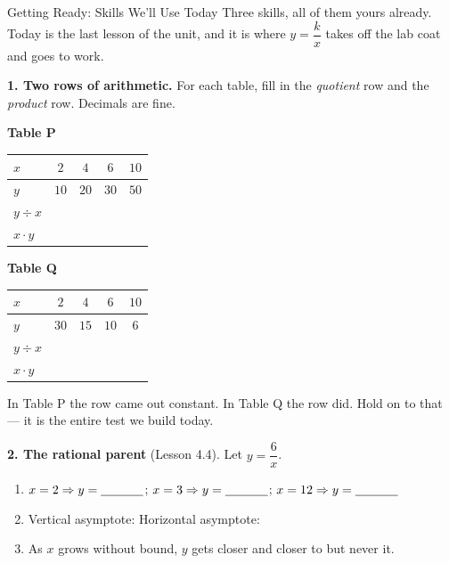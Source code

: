\documentclass[10pt]{article}
\begin{document}
\namedateperiod

\vspace{0.08in}

\begin{notesbox}{Getting Ready: Skills We'll Use Today}
\small Three skills, all of them yours already. Today is the last lesson of the unit, and it is where
$y=\dfrac{k}{x}$ takes off the lab coat and goes to work.

\vspace{4pt}
\textbf{1. Two rows of arithmetic.} For each table, fill in the \emph{quotient} row and the
\emph{product} row. Decimals are fine.
\begin{center}
\begin{minipage}{0.47\linewidth}\centering
\textbf{Table P}\\[2pt]
\renewcommand{\arraystretch}{1.35}
\begin{tabular}{|l|c|c|c|c|}
\hline
\rowcolor{forestbg}
$x$ & $2$ & $4$ & $6$ & $10$ \\ \hline
$y$ & $10$ & $20$ & $30$ & $50$ \\ \hline
$y\div x$ & & & & \\ \hline
$x\cdot y$ & & & & \\ \hline
\end{tabular}
\end{minipage}\hfill
\begin{minipage}{0.47\linewidth}\centering
\textbf{Table Q}\\[2pt]
\renewcommand{\arraystretch}{1.35}
\begin{tabular}{|l|c|c|c|c|}
\hline
\rowcolor{forestbg}
$x$ & $2$ & $4$ & $6$ & $10$ \\ \hline
$y$ & $30$ & $15$ & $10$ & $6$ \\ \hline
$y\div x$ & & & & \\ \hline
$x\cdot y$ & & & & \\ \hline
\end{tabular}
\end{minipage}
\end{center}
\vspace{-2pt}
In Table P the \blank{2.4cm} row came out constant. In Table Q the \blank{2.4cm} row did.
Hold on to that --- it is the entire test we build today.

\vspace{5pt}
\textbf{2. The rational parent} (Lesson 4.4). Let $y=\dfrac{6}{x}$.
\begin{enumerate}[label=(\alph*), leftmargin=2.1em, itemsep=3pt]
  \item $x=2 \Rightarrow y=\blank{1.2cm}$; \quad $x=3 \Rightarrow y=\blank{1.2cm}$; \quad
        $x=12 \Rightarrow y=\blank{1.2cm}$
  \item Vertical asymptote: \blank{1.8cm} \qquad Horizontal asymptote: \blank{1.8cm}
  \item As $x$ grows without bound, $y$ gets closer and closer to \blank{1.4cm} but never
        \blank{2.6cm} it.
\end{enumerate}


\end{notesbox}
\end{document}
